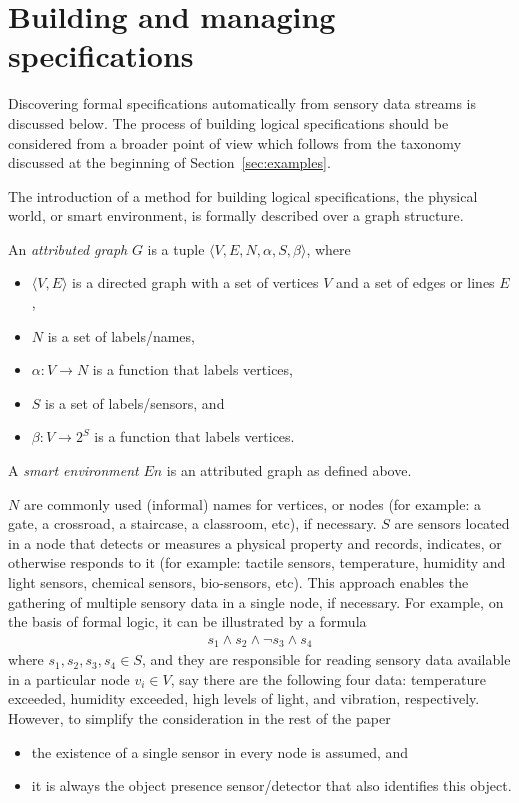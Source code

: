 \documentclass[runningheads,a4paper]{llncs}
\newcommand{\con}{\wedge} \newcommand{\dis}{\vee} \newcommand{\alw}{\Box} \newcommand{\imp}{\Rightarrow} \newcommand{\equ}{\Leftrightarrow} \newcommand{\som}{\Diamond} \newcommand{\nex}{\raisebox{0.2em}{\scriptsize $\bigcirc$}}
\begin{document}
\section{Building and managing specifications}
\label{sec:specifications}

Discovering formal specifications automatically from sensory data streams is discussed below.
The process of building logical specifications should be considered from
a broader point of view which follows from the taxonomy discussed at the beginning of Section~\ref{sec:examples}.

The introduction of a method for building logical specifications,
the physical world, or smart environment, is formally described over a graph structure.
\begin{definition}
An \emph{attributed graph} $G$ is a tuple
$\langle V, E, N, \alpha, S, \beta \rangle$, where
\begin{itemize}
\item $\langle V,E\rangle$ is a directed graph with a set of vertices $V$
and a set of edges or lines $E$,
\item $N$ is a set of labels/names,
\item $\alpha : V \rightarrow N$ is a function that labels vertices,
\item $S$ is a set of labels/sensors, and
\item $\beta : V \rightarrow 2^{S}$ is a function that labels vertices.
\end{itemize}
A \emph{smart environment} $En$ is an attributed graph as defined above.
\end{definition}
$N$ are commonly used (informal) names for vertices, or nodes
(for example: a gate, a crossroad, a staircase, a classroom, etc),
if necessary.
$S$ are sensors located in a node
that detects or measures a physical property and records, indicates, or otherwise responds to it
(for example: tactile sensors,
temperature, humidity and light sensors,
chemical sensors, bio-sensors, etc).
This approach enables the gathering of multiple sensory data in a single node, if necessary.
For example,
on the basis of formal logic,
it can be illustrated by a formula
\begin{eqnarray}
  s_1 \con s_2 \con \neg s_3 \con s_4\label{for:sensors}
\end{eqnarray}
where $s_1, s_2, s_3, s_4 \in S$,
and they are responsible for reading sensory data available in a particular node $v_i \in V$,
say there are the following four data:
temperature exceeded,
humidity exceeded,
high levels of light, and
vibration, respectively.
However,
to simplify the consideration in the rest of the paper
\begin{itemize}
  \item the existence of a single sensor in every node is assumed, and
  \item it is always the object presence sensor/detector that also identifies this object.
\end{itemize}
\end{document}
